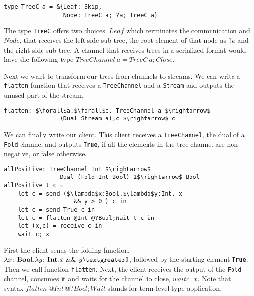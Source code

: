 \documentclass[sigplan]{acmart}
\begin{document}
\begin{lstlisting}
type TreeC a = &{Leaf: Skip, 
                 Node: TreeC a; ?a; TreeC a}
\end{lstlisting}
\vspace{3mm}

The type \lstinline|TreeC| offers two choices: $Leaf$ which terminates the communication and $Node$, that receives the left side sub-tree, the root element of that node as $?a$ and the right side sub-tree.
A channel that receives trees in a serialized format would have the following type $TreeChannel\ a = TreeC\ a;Close$.

Next we want to transform our trees from channels to streams. We can write a \lstinline|flatten| function that receives a \lstinline|TreeChannel| and a \lstinline|Stream| and outputs the unused part of the stream.

\begin{lstlisting}
flatten: $\forall$a.$\forall$c. TreeChannel a $\rightarrow$ 
                (Dual Stream a);c $\rightarrow$ c
\end{lstlisting}
\vspace{3mm}

We can finally write our client. This client receives a \lstinline|TreeChannel|, the dual of a \lstinline|Fold| channel and outputs \textbf{\lstinline|True|}, if all the elements in the tree channel are non negative, or false otherwise.

\begin{lstlisting}
allPositive: TreeChannel Int $\rightarrow$
                Dual (Fold Int Bool) 1$\rightarrow$ Bool
allPositive t c = 
    let c = send ($\lambda$x:Bool.$\lambda$y:Int. x 
                    && y > 0 ) c in
    let c = send True c in
    let c = flatten @Int @?Bool;Wait t c in
    let (x,c) = receive c in
    wait c; x
\end{lstlisting}
\vspace{3mm}

First the client sends the folding function, $\lambda x\colon \textbf{\lstinline|Bool|}.\lambda y\colon\textbf{\lstinline|Int|}.\\ 
x\ \&\&\ y\textgreater 0 $, followed by the starting element  \textbf{\lstinline|True|}. Then we call function \lstinline|flatten|. Next, the client receives the output of the \lstinline|Fold| channel, consumes it and waits for the channel to close, $wait c;\ x$.
Note that syntax $flatten\ @Int\ @?Bool;Wait$ stands for term-level type application. 
\end{document}
